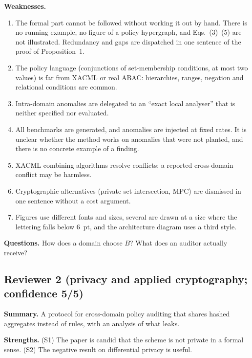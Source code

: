\documentclass[11pt,a4paper]{article}
\begin{document}
\textbf{Weaknesses.}
\begin{enumerate}[label=W1.\arabic*]
\item The formal part cannot be followed without working it out by hand. There is no running example, no figure of a policy hypergraph, and Eqs.~(3)--(5) are not illustrated. Redundancy and gaps are dispatched in one sentence of the proof of Proposition~1.
\item The policy language (conjunctions of set-membership conditions, at most two values) is far from XACML or real ABAC: hierarchies, ranges, negation and relational conditions are common.
\item Intra-domain anomalies are delegated to an ``exact local analyser'' that is neither specified nor evaluated.
\item All benchmarks are generated, and anomalies are injected at fixed rates. It is unclear whether the method works on anomalies that were not planted, and there is no concrete example of a finding.
\item XACML combining algorithms resolve conflicts; a reported cross-domain conflict may be harmless.
\item Cryptographic alternatives (private set intersection, MPC) are dismissed in one sentence without a cost argument.
\item Figures use different fonts and sizes, several are drawn at a size where the lettering falls below 6~pt, and the architecture diagram uses a third style.
\end{enumerate}
\textbf{Questions.} How does a domain choose $B$? What does an auditor actually receive?

\subsection*{Reviewer 2 (privacy and applied cryptography; confidence 5/5)}
\textbf{Summary.} A protocol for cross-domain policy auditing that shares hashed aggregates instead of rules, with an analysis of what leaks.

\textbf{Strengths.} (S1) The paper is candid that the scheme is not private in a formal sense. (S2) The negative result on differential privacy is useful.
\end{document}
